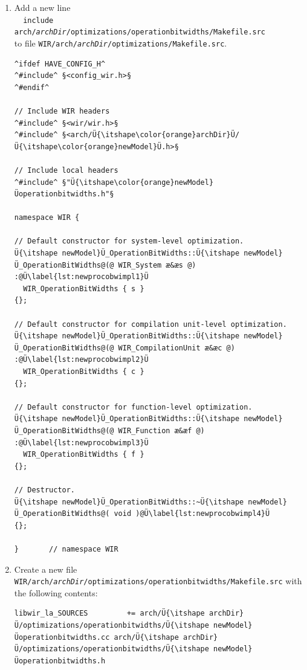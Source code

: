 \begin{enumerate}
\begin{lstlisting}[style=code,float=!t,caption={Header File for a New Processor Model's Operation Bit Width Reduction},label=lst:newprocobwheader]
}       // namespace WIR

^#endif^
\end{lstlisting}

  \item Add a new line \\
  \verb|  include arch/|\texttt{\itshape archDir}\verb|/optimizations/operationbitwidths/Makefile.src| \\
  to file \texttt{WIR/arch/{\itshape archDir}/optimizations/Makefile.src}.

\begin{lstlisting}[style=code,float=!t,caption={Rudimentary Implementation of a New Processor Model's Operation Bit Width Reduction},label=lst:newprocobwimpl]
^ifdef HAVE_CONFIG_H^
^#include^ §<config_wir.h>§
^#endif^

// Include WIR headers
^#include^ §<wir/wir.h>§
^#include^ §<arch/Ü{\itshape\color{orange}archDir}Ü/Ü{\itshape\color{orange}newModel}Ü.h>§

// Include local headers
^#include^ §"Ü{\itshape\color{orange}newModel}Üoperationbitwidths.h"§

namespace WIR {

// Default constructor for system-level optimization.
Ü{\itshape newModel}Ü_OperationBitWidths::Ü{\itshape newModel}Ü_OperationBitWidths@(@ WIR_System æ&æs @) :@Ü\label{lst:newprocobwimpl1}Ü
  WIR_OperationBitWidths { s }
{};

// Default constructor for compilation unit-level optimization.
Ü{\itshape newModel}Ü_OperationBitWidths::Ü{\itshape newModel}Ü_OperationBitWidths@(@ WIR_CompilationUnit æ&æc @) :@Ü\label{lst:newprocobwimpl2}Ü
  WIR_OperationBitWidths { c }
{};

// Default constructor for function-level optimization.
Ü{\itshape newModel}Ü_OperationBitWidths::Ü{\itshape newModel}Ü_OperationBitWidths@(@ WIR_Function æ&æf @) :@Ü\label{lst:newprocobwimpl3}Ü
  WIR_OperationBitWidths { f }
{};

// Destructor.
Ü{\itshape newModel}Ü_OperationBitWidths::~Ü{\itshape newModel}Ü_OperationBitWidths@( void )@Ü\label{lst:newprocobwimpl4}Ü
{};

}       // namespace WIR
\end{lstlisting}

  \item Create a new file \texttt{WIR/arch/{\itshape archDir}/optimizations/operationbitwidths/Makefile.src} with the following contents: \\
\begin{lstlisting}[style=code,float=!ht,xleftmargin=10mm,aboveskip=-0.8 \baselineskip,belowskip=-0.8 \baselineskip]
libwir_la_SOURCES         += arch/Ü{\itshape archDir}Ü/optimizations/operationbitwidths/Ü{\itshape newModel}Üoperationbitwidths.cc arch/Ü{\itshape archDir}Ü/optimizations/operationbitwidths/Ü{\itshape newModel}Üoperationbitwidths.h


\end{lstlisting}
\end{enumerate}
